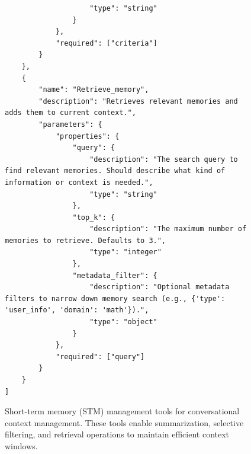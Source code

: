 \begin{figure}[p]
\begin{tcolorbox}
\begin{lstlisting}
                    "type": "string"
                }
            },
            "required": ["criteria"]
        }
    },
    {
        "name": "Retrieve_memory",
        "description": "Retrieves relevant memories and adds them to current context.",
        "parameters": {
            "properties": {
                "query": {
                    "description": "The search query to find relevant memories. Should describe what kind of information or context is needed.",
                    "type": "string"
                },
                "top_k": {
                    "description": "The maximum number of memories to retrieve. Defaults to 3.",
                    "type": "integer"
                },
                "metadata_filter": {
                    "description": "Optional metadata filters to narrow down memory search (e.g., {'type': 'user_info', 'domain': 'math'}).",
                    "type": "object"
                }
            },
            "required": ["query"]
        }
    }
]
\end{lstlisting}
\end{tcolorbox}
\caption{Short-term memory (STM) management tools for conversational context management. These tools enable summarization, selective filtering, and retrieval operations to maintain efficient context windows.}
\label{fig:stm_tool_schemas}
\end{figure}

